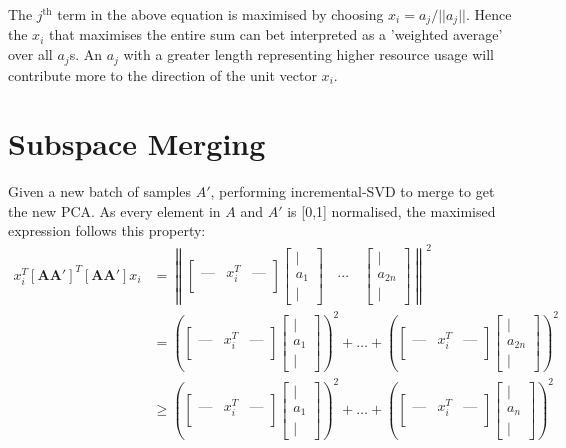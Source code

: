 The $j^{\text{th}}$ term in the above equation is maximised by choosing $x_i =
a_j / ||a_j||$. Hence the $x_i$ that maximises the entire sum can bet
interpreted as a 'weighted average' over all $a_j$s. An $a_j$ with a greater
length representing higher resource usage will contribute more to the direction
of the unit vector $x_i$.

\section{Subspace Merging}
\label{sec:local-merge}
Given a new batch of samples $A'$, performing incremental-SVD to merge to get
the new PCA. As every element in $A$ and $A'$ is [0,1] normalised, the maximised
expression follows this property:
\begin{align}
x_i^T \mathbf{[AA']}^T \mathbf{[AA']} x_i &= \left\| \begin{bmatrix}
\text{---} & x_i^T & \text{---} \\
\end{bmatrix}
\begin{bmatrix}
| \\
a_1 \\
|
\end{bmatrix} \quad \cdots \quad
\begin{bmatrix}
| \\
a_{2n} \\
|
\end{bmatrix} \right\|^2 \\
&= \left( \begin{bmatrix}
\text{---} & x_i^T & \text{---} \\
\end{bmatrix}
\begin{bmatrix}
| \\
a_1 \\
|
\end{bmatrix} \right)^2 +  \dots + \left( \begin{bmatrix}
\text{---} & x_i^T & \text{---} \\
\end{bmatrix}
\begin{bmatrix}
| \\
a_{2n} \\
|
\end{bmatrix} \right)^2 \\
&\geq \left( \begin{bmatrix}
\text{---} & x_i^T & \text{---} \\
\end{bmatrix}
\begin{bmatrix}
| \\
a_1 \\
|
\end{bmatrix} \right)^2 + \dots + \left( \begin{bmatrix}
\text{---} & x_i^T & \text{---} \\
\end{bmatrix}
\begin{bmatrix}
| \\
a_{n} \\
|
\end{bmatrix} \right)^2
\end{align}

